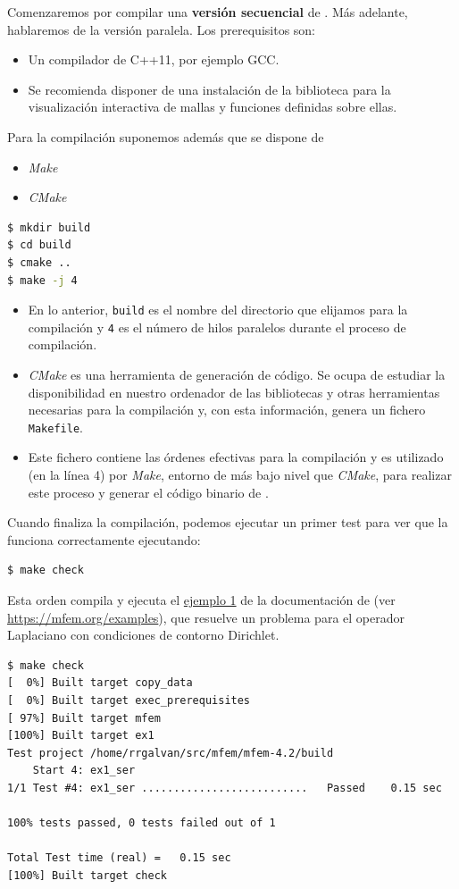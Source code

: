 Comenzaremos por compilar una \textbf{versión secuencial} de \mfem. Más
adelante, hablaremos de la versión paralela. Los prerequisitos son:
\begin{itemize}
\item Un compilador de C++11, por ejemplo GCC.
\item Se recomienda disponer de una instalación de la biblioteca
  \textit{\glvis} para la visualización interactiva de mallas y
  funciones definidas sobre ellas.
\end{itemize}

Para la compilación suponemos además que se dispone de
\begin{itemize}
\item \textit{Make}
\item \textit{CMake}
\end{itemize}

\begin{lstlisting}[language=sh]
$ mkdir build
$ cd build
$ cmake ..
$ make -j 4
\end{lstlisting}

\begin{itemize}
\item En lo anterior, \texttt{build} es el nombre del directorio que
  elijamos para la compilación y \texttt{4} es el número de hilos
  paralelos durante el proceso de compilación.

\item \textit{CMake} es una
  herramienta de generación de código. Se ocupa de estudiar la
  disponibilidad en nuestro ordenador de las bibliotecas y otras
  herramientas necesarias para la compilación y, con esta información,
  genera un fichero \texttt{Makefile}.

\item Este fichero contiene las órdenes efectivas para la compilación
  y es utilizado (en la línea 4) por \textit{Make}, entorno de más
  bajo nivel que \textit{CMake}, para realizar este proceso y generar
  el código binario de \mfem.
\end{itemize}

Cuando finaliza la compilación, podemos ejecutar un primer test para
ver que la \mfem funciona correctamente ejecutando:
\begin{lstlisting}[language=sh]
$ make check
\end{lstlisting}
Esta orden compila y ejecuta el
\href{https://github.com/mfem/mfem/blob/master/examples/ex1.cpp}{ejemplo
  1} de la documentación de \mfem (ver
\url{https://mfem.org/examples}), que resuelve un problema para el
operador Laplaciano con condiciones de contorno Dirichlet.
\begin{lstlisting}
$ make check
[  0%] Built target copy_data
[  0%] Built target exec_prerequisites
[ 97%] Built target mfem
[100%] Built target ex1
Test project /home/rrgalvan/src/mfem/mfem-4.2/build
    Start 4: ex1_ser
1/1 Test #4: ex1_ser ..........................   Passed    0.15 sec

100% tests passed, 0 tests failed out of 1

Total Test time (real) =   0.15 sec
[100%] Built target check
\end{lstlisting}


